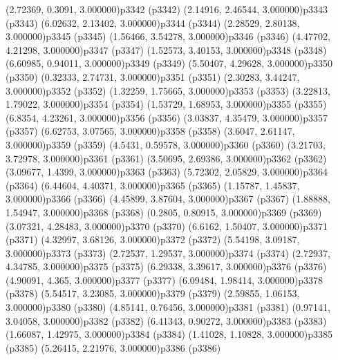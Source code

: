 \psPoint(2.72369, 0.3091, 3.000000){p3342}
\psdot(p3342)
\psPoint(2.14916, 2.46544, 3.000000){p3343}
\psdot(p3343)
\psPoint(6.02632, 2.13402, 3.000000){p3344}
\psdot(p3344)
\psPoint(2.28529, 2.80138, 3.000000){p3345}
\psdot(p3345)
\psPoint(1.56466, 3.54278, 3.000000){p3346}
\psdot(p3346)
\psPoint(4.47702, 4.21298, 3.000000){p3347}
\psdot(p3347)
\psPoint(1.52573, 3.40153, 3.000000){p3348}
\psdot(p3348)
\psPoint(6.60985, 0.94011, 3.000000){p3349}
\psdot(p3349)
\psPoint(5.50407, 4.29628, 3.000000){p3350}
\psdot(p3350)
\psPoint(0.32333, 2.74731, 3.000000){p3351}
\psdot(p3351)
\psPoint(2.30283, 3.44247, 3.000000){p3352}
\psdot(p3352)
\psPoint(1.32259, 1.75665, 3.000000){p3353}
\psdot(p3353)
\psPoint(3.22813, 1.79022, 3.000000){p3354}
\psdot(p3354)
\psPoint(1.53729, 1.68953, 3.000000){p3355}
\psdot(p3355)
\psPoint(6.8354, 4.23261, 3.000000){p3356}
\psdot(p3356)
\psPoint(3.03837, 4.35479, 3.000000){p3357}
\psdot(p3357)
\psPoint(6.62753, 3.07565, 3.000000){p3358}
\psdot(p3358)
\psPoint(3.6047, 2.61147, 3.000000){p3359}
\psdot(p3359)
\psPoint(4.5431, 0.59578, 3.000000){p3360}
\psdot(p3360)
\psPoint(3.21703, 3.72978, 3.000000){p3361}
\psdot(p3361)
\psPoint(3.50695, 2.69386, 3.000000){p3362}
\psdot(p3362)
\psPoint(3.09677, 1.4399, 3.000000){p3363}
\psdot(p3363)
\psPoint(5.72302, 2.05829, 3.000000){p3364}
\psdot(p3364)
\psPoint(6.44604, 4.40371, 3.000000){p3365}
\psdot(p3365)
\psPoint(1.15787, 1.45837, 3.000000){p3366}
\psdot(p3366)
\psPoint(4.45899, 3.87604, 3.000000){p3367}
\psdot(p3367)
\psPoint(1.88888, 1.54947, 3.000000){p3368}
\psdot(p3368)
\psPoint(0.2805, 0.80915, 3.000000){p3369}
\psdot(p3369)
\psPoint(3.07321, 4.28483, 3.000000){p3370}
\psdot(p3370)
\psPoint(6.6162, 1.50407, 3.000000){p3371}
\psdot(p3371)
\psPoint(4.32997, 3.68126, 3.000000){p3372}
\psdot(p3372)
\psPoint(5.54198, 3.09187, 3.000000){p3373}
\psdot(p3373)
\psPoint(2.72537, 1.29537, 3.000000){p3374}
\psdot(p3374)
\psPoint(2.72937, 4.34785, 3.000000){p3375}
\psdot(p3375)
\psPoint(6.29338, 3.39617, 3.000000){p3376}
\psdot(p3376)
\psPoint(4.90091, 4.365, 3.000000){p3377}
\psdot(p3377)
\psPoint(6.09484, 1.98414, 3.000000){p3378}
\psdot(p3378)
\psPoint(5.54517, 3.23085, 3.000000){p3379}
\psdot(p3379)
\psPoint(2.59855, 1.06153, 3.000000){p3380}
\psdot(p3380)
\psPoint(4.85141, 0.76456, 3.000000){p3381}
\psdot(p3381)
\psPoint(0.97141, 3.04058, 3.000000){p3382}
\psdot(p3382)
\psPoint(6.41343, 0.90272, 3.000000){p3383}
\psdot(p3383)
\psPoint(1.66087, 1.42975, 3.000000){p3384}
\psdot(p3384)
\psPoint(1.41028, 1.10828, 3.000000){p3385}
\psdot(p3385)
\psPoint(5.26415, 2.21976, 3.000000){p3386}
\psdot(p3386)
